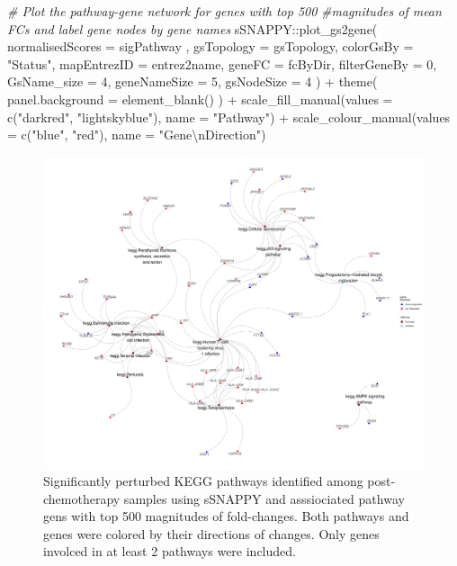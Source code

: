 \documentclass[9pt,a4paper,]{extarticle}
\newenvironment{Shaded}{\begin{snugshade}}{\end{snugshade}}
\newcommand{\AttributeTok}[1]{\textcolor[rgb]{0.77,0.63,0.00}{#1}}
\newcommand{\CommentTok}[1]{\textcolor[rgb]{0.56,0.35,0.01}{\textit{#1}}}
\newcommand{\DecValTok}[1]{\textcolor[rgb]{0.00,0.00,0.81}{#1}}
\newcommand{\FunctionTok}[1]{\textcolor[rgb]{0.00,0.00,0.00}{#1}}
\newcommand{\NormalTok}[1]{#1}
\newcommand{\SpecialCharTok}[1]{\textcolor[rgb]{0.00,0.00,0.00}{#1}}
\newcommand{\StringTok}[1]{\textcolor[rgb]{0.31,0.60,0.02}{#1}}
\begin{document}
\begin{Shaded}
\begin{Highlighting}[]
\CommentTok{\# Plot the pathway{-}gene network for genes with top 500 }
\CommentTok{\#magnitudes of mean FCs and label gene nodes by gene names}
\NormalTok{sSNAPPY}\SpecialCharTok{::}\FunctionTok{plot\_gs2gene}\NormalTok{(}
    \AttributeTok{normalisedScores =}\NormalTok{ sigPathway , }
    \AttributeTok{gsTopology =}\NormalTok{ gsTopology, }
    \AttributeTok{colorGsBy =} \StringTok{"Status"}\NormalTok{, }
    \AttributeTok{mapEntrezID =}\NormalTok{ entrez2name, }
    \AttributeTok{geneFC =}\NormalTok{ fcByDir, }
    \AttributeTok{filterGeneBy =} \DecValTok{0}\NormalTok{,}
    \AttributeTok{GsName\_size =} \DecValTok{4}\NormalTok{,}
     \AttributeTok{geneNameSize =} \DecValTok{5}\NormalTok{, }
    \AttributeTok{gsNodeSize =} \DecValTok{4}
\NormalTok{) }\SpecialCharTok{+}
    \FunctionTok{theme}\NormalTok{(}
        \AttributeTok{panel.background =} \FunctionTok{element\_blank}\NormalTok{()}
\NormalTok{) }\SpecialCharTok{+}
  \FunctionTok{scale\_fill\_manual}\NormalTok{(}\AttributeTok{values =} \FunctionTok{c}\NormalTok{(}\StringTok{"darkred"}\NormalTok{, }\StringTok{"lightskyblue"}\NormalTok{), }\AttributeTok{name =} \StringTok{"Pathway"}\NormalTok{) }\SpecialCharTok{+}
  \FunctionTok{scale\_colour\_manual}\NormalTok{(}\AttributeTok{values =} \FunctionTok{c}\NormalTok{(}\StringTok{"blue"}\NormalTok{, }\StringTok{"red"}\NormalTok{), }\AttributeTok{name =} \StringTok{"Gene}\SpecialCharTok{\textbackslash{}n}\StringTok{Direction"}\NormalTok{)}
\end{Highlighting}
\end{Shaded}

\begin{figure}

{\centering \includegraphics[width=0.8\linewidth]{sSNAPPY_paper_files/figure-latex/Figure4-1} 

}

\caption{Significantly perturbed KEGG pathways identified among post-chemotherapy samples using sSNAPPY and asssiociated pathway gens with top 500 magnitudes of fold-changes. Both pathways and genes were colored by their directions of changes. Only genes involced in at least 2 pathways were included.}\label{fig:Figure4}
\end{figure}
\end{document}
